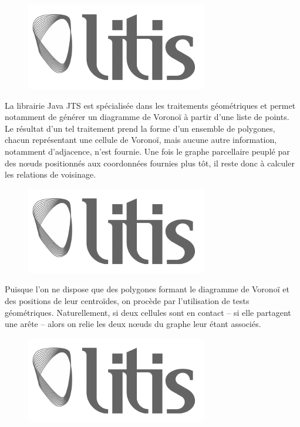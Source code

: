 \documentclass[12pt]{article}
\begin{document}
\begin{figure}
  \centering
  \includegraphics[width=.6\linewidth]{images/logo-litis.png}
  \caption{}
  \label{fig:construction-bati1}
\end{figure}

La librairie Java JTS \cite{JTS} est spécialisée dans les traitements
géométriques et permet notamment de générer un diagramme de Voronoï à
partir d'une liste de points. Le résultat d'un tel traitement prend la
forme d'un ensemble de polygones, chacun représentant une cellule de
Voronoï, mais aucune autre information, notamment d'adjacence, n'est
fournie. Une fois le graphe parcellaire peuplé par des n\oe uds
positionnés aux coordonnées fournies plus tôt, il reste donc à
calculer les relations de voisinage.

\begin{figure}
  \centering
  \includegraphics[width=.6\linewidth]{images/logo-litis.png}
  \caption{}
  \label{fig:construction-bati2}
\end{figure}

Puisque l'on ne dispose que des polygones formant le diagramme de
Voronoï et des positions de leur centroïdes, on procède par
l'utilisation de tests géométriques. Naturellement, si deux cellules
sont en contact -- si elle partagent une arête -- alors on relie les
deux n\oe uds du graphe leur étant associés.

\begin{figure}
  \centering
  \includegraphics[width=.6\linewidth]{images/logo-litis.png}
  \caption{}
  \label{fig:construction-bati3}
\end{figure}
\end{document}

